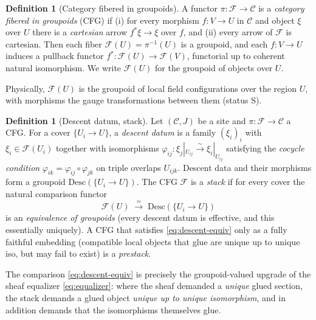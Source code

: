 \documentclass[12pt]{article}
\theoremstyle{definition}
\newtheorem{definition}[theorem]{Definition}
\theoremstyle{remark}
\newcommand{\cat}[1]{\mathcal{#1}}
\newcommand{\Set}{\mathbf{Set}}
\newcommand{\op}{\mathrm{op}}
\newcommand{\Ss}{\textsf{S}}
\begin{document}
\begin{definition}[Category fibered in groupoids]
\label{def:cfg}
A functor $\pi:\cat F\to\cat C$ is a \emph{category fibered in groupoids} (CFG) if
(i) for every morphism $f:V\to U$ in $\cat C$ and object $\xi$ over $U$ there is a
\emph{cartesian} arrow $f^*\xi\to\xi$ over $f$, and (ii) every arrow of $\cat F$ is
cartesian. Then each fiber $\cat F(U)=\pi^{-1}(U)$ is a groupoid, and each $f:V\to U$
induces a pullback functor $f^*:\cat F(U)\to\cat F(V)$, functorial up to coherent
natural isomorphism. We write $\cat F(U)$ for the groupoid of objects over $U$.
\end{definition}

Physically, $\cat F(U)$ is the groupoid of local field configurations over the region
$U$, with morphisms the gauge transformations between them (status \Ss).

\begin{definition}[Descent datum, stack]
\label{def:stack}
Let $(\cat C, J)$ be a site and $\pi:\cat F\to\cat C$ a CFG. For a cover
$\{U_i\to U\}$, a \emph{descent datum} is a family $(\xi_i)_i$ with $\xi_i\in\cat F(U_i)$
together with isomorphisms $\varphi_{ij}: \xi_j|_{U_{ij}}\xrightarrow{\sim}
\xi_i|_{U_{ij}}$ satisfying the \emph{cocycle condition}
$\varphi_{ik}=\varphi_{ij}\circ\varphi_{jk}$ on triple overlaps $U_{ijk}$. Descent
data and their morphisms form a groupoid $\mathrm{Desc}(\{U_i\to U\})$. The CFG $\cat F$
is a \emph{stack} if for every cover the natural comparison functor
\begin{equation}
\cat F(U)\;\xrightarrow{\ \simeq\ }\;\mathrm{Desc}(\{U_i\to U\})
\label{eq:descent-equiv}
\end{equation}
is an \emph{equivalence of groupoids} (every descent datum is effective, and this
essentially uniquely). A CFG that satisfies \eqref{eq:descent-equiv} only as a fully
faithful embedding (compatible local objects that glue are unique up to unique iso, but
may fail to exist) is a \emph{prestack}.
\end{definition}

The comparison \eqref{eq:descent-equiv} is precisely the groupoid-valued upgrade of the
sheaf equalizer \eqref{eq:equalizer}: where the sheaf demanded a \emph{unique} glued
section, the stack demands a glued object \emph{unique up to unique isomorphism}, and
in addition demands that the isomorphisms themselves glue.

\begin{center}
\end{center}
\end{document}
